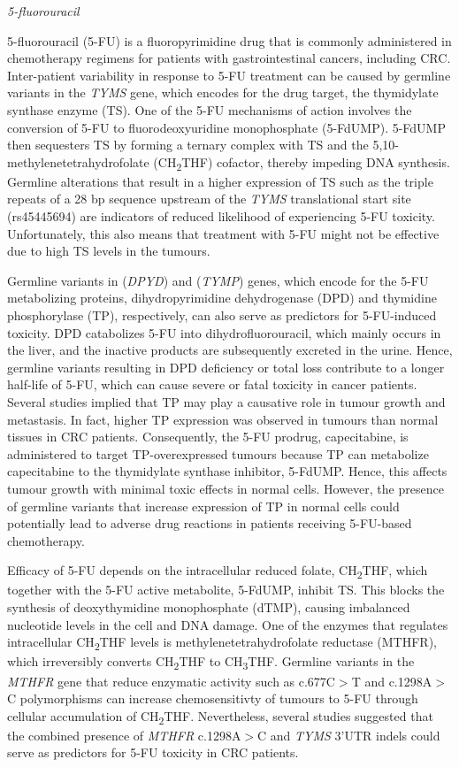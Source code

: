 \vspace{5mm}
\noindent\textit{5-fluorouracil}

5-fluorouracil (5-FU) is a fluoropyrimidine drug that is commonly administered in chemotherapy regimens for patients with gastrointestinal cancers, including CRC. Inter-patient variability in response to 5-FU treatment can be caused by germline variants in the \textit{TYMS} gene, which encodes for the drug target, the thymidylate synthase enzyme (TS). One of the 5-FU mechanisms of action involves the conversion of 5-FU to fluorodeoxyuridine monophosphate (5-FdUMP). 5-FdUMP then sequesters TS by forming a ternary complex with TS and the 5,10-methylenetetrahydrofolate (CH\textsubscript{2}THF) cofactor, thereby impeding DNA synthesis. Germline alterations that result in a higher expression of TS such as the triple repeats of a 28 bp sequence upstream of the \textit{TYMS} translational start site (rs45445694) are indicators of reduced likelihood of experiencing 5-FU toxicity. Unfortunately, this also means that treatment with 5-FU might not be effective due to high TS levels in the tumours.

Germline variants in (\textit{DPYD}) and (\textit{TYMP}) genes, which encode for the 5-FU metabolizing proteins, dihydropyrimidine dehydrogenase (DPD) and thymidine phosphorylase (TP), respectively, can also serve as predictors for 5-FU-induced toxicity. DPD catabolizes 5-FU into dihydrofluorouracil, which mainly occurs in the liver, and the inactive products are subsequently excreted in the urine. Hence, germline variants resulting in DPD deficiency or total loss contribute to a longer half-life of 5-FU, which can cause severe or fatal toxicity in cancer patients. Several studies implied that TP may play a causative role in tumour growth and metastasis. In fact, higher TP expression was observed in tumours than normal tissues in CRC patients. Consequently, the 5-FU prodrug, capecitabine, is administered to target TP-overexpressed tumours because TP can metabolize capecitabine to the thymidylate synthase inhibitor, 5-FdUMP. Hence, this affects tumour growth with minimal toxic effects in normal cells. However, the presence of germline variants that increase expression of TP in normal cells could potentially lead to adverse drug reactions in patients receiving 5-FU-based chemotherapy.

Efficacy of 5-FU depends on the intracellular reduced folate, CH\textsubscript{2}THF, which together with the 5-FU active metabolite, 5-FdUMP, inhibit TS. This blocks the synthesis of deoxythymidine monophosphate (dTMP), causing imbalanced nucleotide levels in the cell and DNA damage. One of the enzymes that regulates intracellular CH\textsubscript{2}THF levels is methylenetetrahydrofolate reductase (MTHFR), which irreversibly converts CH\textsubscript{2}THF to CH\textsubscript{3}THF. Germline variants in the \textit{MTHFR} gene that reduce enzymatic activity such as c.677C$>$T and c.1298A$>$C polymorphisms can increase chemosensitivty of tumours to 5-FU through cellular accumulation of CH\textsubscript{2}THF. Nevertheless, several studies suggested that the combined presence of \textit{MTHFR} c.1298A$>$C and \textit{TYMS} 3’UTR indels could serve as predictors for 5-FU toxicity in CRC patients.

